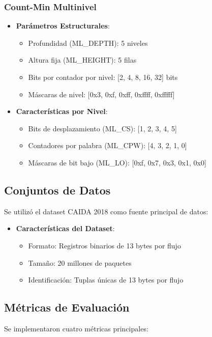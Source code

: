 \documentclass[a4paper,12pt]{article}
\begin{document}
\subsubsection{Count-Min Multinivel}
\begin{itemize}
    \item \textbf{Parámetros Estructurales}:
    \begin{itemize}
        \item Profundidad (ML\_DEPTH): 5 niveles
        \item Altura fija (ML\_HEIGHT): 5 filas
        \item Bits por contador por nivel: [2, 4, 8, 16, 32] bits
        \item Máscaras de nivel: [0x3, 0xf, 0xff, 0xffff, 0xfffff]
    \end{itemize}
    
    \item \textbf{Características por Nivel}:
    \begin{itemize}
        \item Bits de desplazamiento (ML\_CS): [1, 2, 3, 4, 5]
        \item Contadores por palabra (ML\_CPW): [4, 3, 2, 1, 0]
        \item Máscaras de bit bajo (ML\_LO): [0xf, 0x7, 0x3, 0x1, 0x0]
    \end{itemize}
\end{itemize}

\subsection{Conjuntos de Datos}
Se utilizó el dataset CAIDA 2018 como fuente principal de datos:

\begin{itemize}
    \item \textbf{Características del Dataset}:
    \begin{itemize}
        \item Formato: Registros binarios de 13 bytes por flujo
        \item Tamaño: 20 millones de paquetes
        \item Identificación: Tuplas únicas de 13 bytes por flujo
    \end{itemize}
\end{itemize}

\subsection{Métricas de Evaluación}
Se implementaron cuatro métricas principales:
\end{document}
